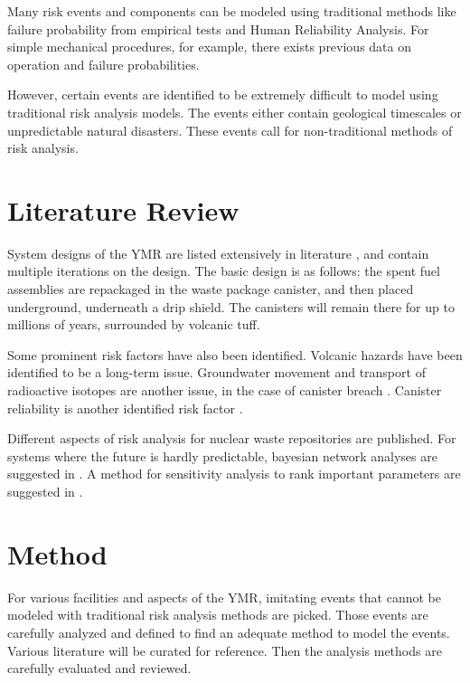 \documentclass[12pt]{article}
\begin{document}
Many risk events and components can be modeled using traditional methods like
failure probability from empirical tests and Human Reliability Analysis.
For simple mechanical procedures, for example, there exists previous data
on operation and failure probabilities. 

However, certain events are identified to be extremely difficult
to model using traditional risk analysis models. The events either
contain geological timescales or unpredictable natural disasters.
These events call for non-traditional methods of risk analysis.


\section{Literature Review}
System designs of the \gls{YMR} are listed extensively in literature \cite{u.s._department_of_energy_office_of_civilian_radioactive_waste_management_national_2008, wilson_total-system_1994, rechard_evolution_2014, u.s._department_of_energy_yucca_2002}, and contain multiple
iterations on the design. The basic design is as follows: the spent fuel assemblies
are repackaged in the waste package canister, and then placed underground,
underneath a drip shield. The canisters will remain there for up to millions of years,
surrounded by volcanic tuff.

Some prominent risk factors have also been identified. Volcanic hazards \cite{ho_risk_1992, smith_area_1990}
have been identified to be a long-term issue. Groundwater movement and transport of 
radioactive isotopes are another issue, in the case of canister breach \cite{robison_ground-water_1984, quade_fossil_1995}.  Canister reliability is another
identified risk factor \cite{whipple_can_1996, rutqvist_analysis_2003}.

Different aspects of risk analysis for nuclear waste repositories are published.
For systems where the future is hardly predictable, bayesian network analyses are 
suggested in \cite{lee_application_2006}. A method for sensitivity analysis
to rank important parameters are suggested in \cite{mohanty_cdf_2001}.


\section{Method}

For various facilities and aspects of the \gls{YMR}, imitating events that
cannot be modeled with traditional risk analysis methods are picked.
Those events are carefully analyzed and defined to find an adequate
method to model the events. Various literature will be curated for
reference. Then the analysis methods are carefully evaluated and reviewed.
\end{document}
